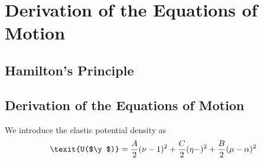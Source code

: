 \documentclass[12pt]{article}
\newcommand{\cB}{B}
\newcommand{\cA}{A}
\newcommand{\cC}{C}
\begin{document}
\section{Derivation of the Equations of Motion
}\label{Derivation of the Equations of Motion
}
\subsection{Hamilton's Principle}
\subsection{Derivation of the Equations of Motion}
We introduce the elastic potential density as
\[ \texit{U($\y$)} = \frac{\cA}{2} (\nu - 1)^2
+\frac{\cC}{2} (\eta - )^2
+\frac{\cB}{2} (\mu -\alpha)^2 
\]
\end{document}

